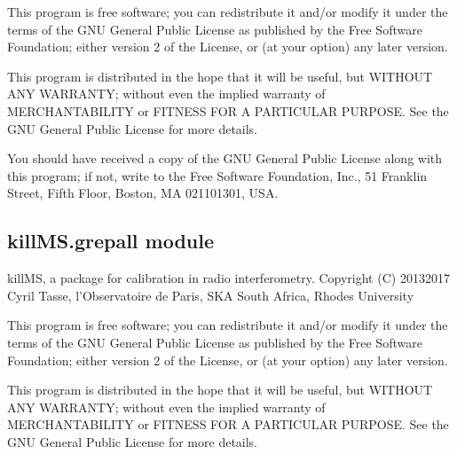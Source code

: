 \documentclass[letterpaper,10pt,english]{sphinxmanual}
\begin{document}
\sphinxAtStartPar
This program is free software; you can redistribute it and/or
modify it under the terms of the GNU General Public License
as published by the Free Software Foundation; either version 2
of the License, or (at your option) any later version.

\sphinxAtStartPar
This program is distributed in the hope that it will be useful,
but WITHOUT ANY WARRANTY; without even the implied warranty of
MERCHANTABILITY or FITNESS FOR A PARTICULAR PURPOSE.  See the
GNU General Public License for more details.

\sphinxAtStartPar
You should have received a copy of the GNU General Public License
along with this program; if not, write to the Free Software
Foundation, Inc., 51 Franklin Street, Fifth Floor, Boston, MA  02110\sphinxhyphen{}1301, USA.

\begin{fulllineitems}
\label{\detokenize{api/killMS:killMS.dsc.driver}}
\pysigstartsignatures
{}
\pysigstopsignatures
\end{fulllineitems}



\subsection{killMS.grepall module}
\label{\detokenize{api/killMS:module-killMS.grepall}}\label{\detokenize{api/killMS:killms-grepall-module}}
\sphinxAtStartPar
killMS, a package for calibration in radio interferometry.
Copyright (C) 2013\sphinxhyphen{}2017  Cyril Tasse, l’Observatoire de Paris,
SKA South Africa, Rhodes University

\sphinxAtStartPar
This program is free software; you can redistribute it and/or
modify it under the terms of the GNU General Public License
as published by the Free Software Foundation; either version 2
of the License, or (at your option) any later version.

\sphinxAtStartPar
This program is distributed in the hope that it will be useful,
but WITHOUT ANY WARRANTY; without even the implied warranty of
MERCHANTABILITY or FITNESS FOR A PARTICULAR PURPOSE.  See the
GNU General Public License for more details.
\end{document}
